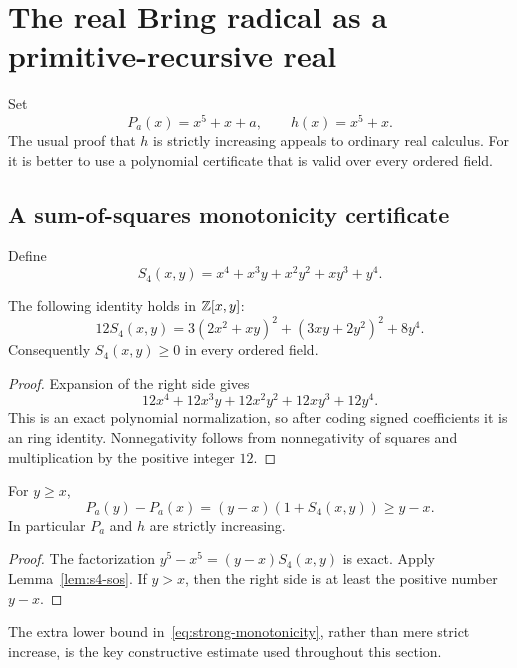 \section{The real Bring radical as a primitive-recursive real}\label{sec:real-bring}

Set
\[
 P_a(x)=x^5+x+a,
 \qquad h(x)=x^5+x.
\]
The usual proof that \(h\) is strictly increasing appeals to ordinary real
calculus.  For \ipra{} it is better to use a polynomial certificate that is
valid over every ordered field.

\subsection{A sum-of-squares monotonicity certificate}

Define
\[
 S_4(x,y)=x^4+x^3y+x^2y^2+xy^3+y^4.
\]

\begin{lemma}
\label{lem:s4-sos}
The following identity holds in \(\mathbb Z[x,y]\):
\begin{equation}\label{eq:s4-sos}
 12S_4(x,y)
 =3(2x^2+xy)^2+(3xy+2y^2)^2+8y^4.
\end{equation}
Consequently \(S_4(x,y)\ge0\) in every ordered field.
\end{lemma}

\begin{proof}
Expansion of the right side gives
\[
 12x^4+12x^3y+12x^2y^2+12xy^3+12y^4.
\]
This is an exact polynomial normalization, so after coding signed coefficients
it is an \ipra{} ring identity.  Nonnegativity follows from nonnegativity of
squares and multiplication by the positive integer \(12\).
\end{proof}

\begin{theorem}\label{thm:strong-monotonicity}
For \(y\ge x\),
\begin{equation}\label{eq:strong-monotonicity}
 P_a(y)-P_a(x)
 =(y-x)(1+S_4(x,y))\ge y-x.
\end{equation}
In particular \(P_a\) and \(h\) are strictly increasing.
\end{theorem}

\begin{proof}
The factorization
\(y^5-x^5=(y-x)S_4(x,y)\) is exact.  Apply
Lemma~\ref{lem:s4-sos}.  If \(y>x\), then the right side is at least the
positive number \(y-x\).
\end{proof}

The extra lower bound in~\eqref{eq:strong-monotonicity}, rather than mere strict
increase, is the key constructive estimate used throughout this section.

